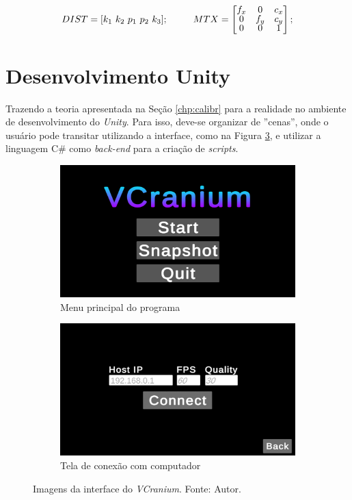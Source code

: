 \[ DIST = [ k_1 \ k_2 \ p_1 \ p_2 \ k_3 ]; \ \ \ \ \ \ \ \
MTX = 
\renewcommand\arraystretch{.8}
\begin{bmatrix}
    f_x & 0 & c_x \\
    0 & f_y & c_y \\
    0 & 0 & 1
\end{bmatrix};\]

\section{Desenvolvimento Unity}

Trazendo a teoria apresentada na Seção \ref{chp:calibr} para a realidade no ambiente de desenvolvimento do \textit{Unity}. Para isso, deve-se organizar de ''cenas'', onde o usuário pode transitar utilizando a interface, como na Figura \ref{fig:ui1}, e utilizar a linguagem C\# como \textit{back-end} para a criação de \textit{scripts}.

\begin{figure}[ht]
    \centering
        \begin{subfigure}{.45\textwidth}
            \centering
            \includegraphics[width=.95\linewidth]{figuras/vcranium_main.png}
            \caption{Menu principal do programa}
            \label{fig:vcranium-connect}
        \end{subfigure}
        \begin{subfigure}{.45\textwidth}
            \centering
            \includegraphics[width=.95\linewidth]{figuras/vcranium_connect.png}
            \caption{Tela de conexão com computador}
            \label{fig:vcranium2-connect}
        \end{subfigure}
        \caption{Imagens da interface do \textit{VCranium}. Fonte: Autor.}
        \label{fig:ui1}
\end{figure}

